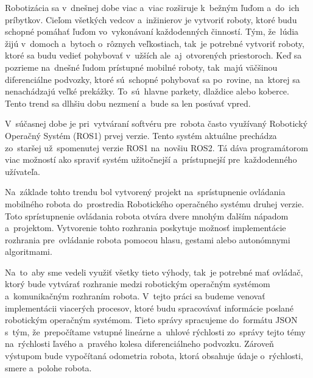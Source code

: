 
Robotizácia sa v~dnešnej dobe viac a~viac rozširuje k~bežným ľuďom a~do~ich príbytkov. Cieľom všetkých vedcov
a~inžinierov je vytvoriť roboty, ktoré budu schopné pomáhať ľuďom vo~vykonávaní každodenných činností. Tým,
že~lúdia žijú v~domoch a~bytoch o~rôznych veľkostiach, tak~je potrebné vytvoriť roboty, ktoré sa budu vedieť
pohybovať v~užších ale~aj~otvorených priestoroch. Keď sa pozrieme na~dnešné ľudom prístupné mobilné roboty,
tak~majú väčšinou diferenciálne podvozky, ktoré sú~schopné pohybovať sa po~rovine, na~ktorej sa nenachádzajú veľké
prekážky. To~sú~hlavne parkety, dlaždice alebo koberce. Tento trend sa dlhšiu dobu nezmení a~bude sa len posúvať
vpred.

V~súčasnej dobe je pri~vytváraní softvéru pre~robota často využívaný Robotický Operačný Systém (ROS1) prvej verzie.
Tento systém aktuálne prechádza zo~staršej už~spomenutej verzie ROS1 na~novšiu ROS2. Tá dáva programátorom viac
možností ako spraviť systém užitočnejší a~prístupnejší pre~každodenného užívateľa.

Na~základe tohto trendu bol vytvorený projekt na~sprístupnenie ovládania mobilného robota do~prostredia Robotického
operačného systému druhej verzie. Toto sprístupnenie ovládania robota otvára dvere mnohým ďalším nápadom a~projektom.
Vytvorenie tohto rozhrania poskytuje možnosť implementácie rozhrania pre~ovládanie robota pomocou hlasu, gestami alebo
autonómnymi algoritmami.

Na~to~aby sme vedeli využiť všetky tieto výhody, tak~je potrebné mať ovládač, ktorý bude vytvárať rozhranie medzi
robotickým operačným systémom a~komunikačným rozhraním robota. V~tejto práci sa budeme venovať implementácii viacerých
procesov, ktoré budu spracovávať informácie poslané robotickým operačným systémom. Tieto správy spracujeme
do~formátu JSON s~tým, že~prepočítame vstupné lineárne a~uhlové rýchlosti zo~správy tejto témy na~rýchlosti ľavého
a~pravého kolesa diferenciálneho podvozku. Zároveň výstupom bude vypočítaná odometria robota, ktorá obsahuje údaje
o~rýchlosti, smere a~polohe robota.
